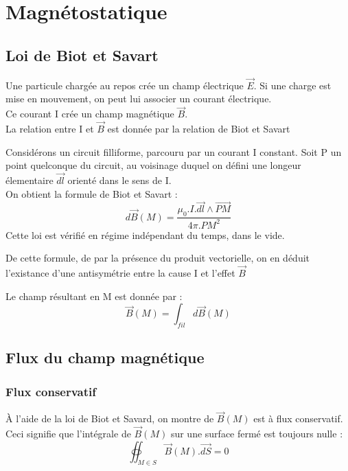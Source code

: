 \chapter{Magnétostatique}
\section{Loi de Biot et Savart}
Une particule chargée au repos crée un champ électrique $\overrightarrow{E}$. Si une charge est mise en mouvement, on peut lui associer un courant électrique.\\
Ce courant I crée un champ magnétique $\overrightarrow{B}$.\\
La relation entre I et $\overrightarrow{B}$ est donnée par la relation de Biot et Savart
\begin{theo}
Considérons un circuit filliforme, parcouru par un courant I constant. Soit P un point quelconque du circuit, au voisinage duquel on défini une longeur élementaire $\overrightarrow{dl}$ orienté dans le sens de I.\\
On obtient la formule de Biot et Savart : 
$$d\overrightarrow{B}(M) = \dfrac{\mu_0.I.\overrightarrow{dl}\wedge\overrightarrow{PM}}{4\pi.PM^2}$$
Cette loi est vérifié en régime indépendant du temps, dans le vide.
\end{theo}
\begin{prop}
De cette formule, de par la présence du produit vectorielle, on en déduit l'existance d'une antisymétrie entre la cause I et l'effet $\overrightarrow{B}$
\end{prop}
\begin{prop}
Le champ résultant en M est donnée par : 
$$\overrightarrow{B}(M) = \int_{fil} d\overrightarrow{B}(M)$$ 
\end{prop}
\section{Flux du champ magnétique}
\subsection{Flux conservatif}
\begin{prop}
À l'aide de la loi de Biot et Savard, on montre de $\overrightarrow{B}(M)$ est à flux conservatif. Ceci signifie que l'intégrale de $\overrightarrow{B}(M)$ sur une surface fermé est toujours nulle : 
$$\oiint_{M \in S} \overrightarrow{B}(M).\overrightarrow{dS} = 0$$
\end{prop}
